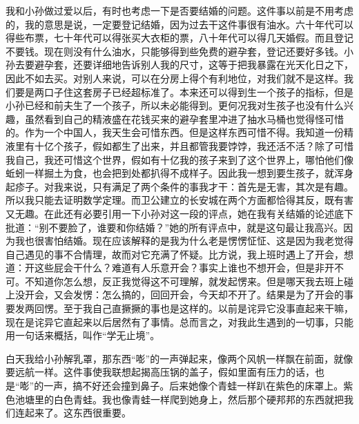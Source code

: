 我和小孙做过爱以后，有时也考虑一下是否要结婚的问题。这件事以前是不用考虑的，我的意思是说，一定要登记结婚，因为过去干这件事很有油水。六十年代可以得些布票，七十年代可以得张买大衣柜的票，八十年代可以得几天婚假。而且登记不要钱。现在则没有什么油水，只能够得到些免费的避孕套，登记还要好多钱。小孙去要避孕套，还要详细地告诉别人我的尺寸，这等于把我暴露在光天化日之下，因此不如去买。对别人来说，可以在分房上得个有利地位，对我们就不是这样。我们要是两口子住这套房子已经超标准了。本来还可以得到生一个孩子的指标，但是小孙已经和前夫生了一个孩子，所以未必能得到。更何况我对生孩子也没有什么兴趣，虽然看到自己的精液盛在花钱买来的避孕套里冲进了抽水马桶也觉得怪可惜的。作为一个中国人，我天生会可惜东西。但是这样东西可惜不得。我知道一份精液里有十亿个孩子，假如都生了出来，并且都管我要饽饽，我还活不活？除了可惜我自己，我还可惜这个世界，假如有十亿我的孩子来到了这个世界上，哪怕他们像蚯蚓一样掘土为食，也会把到处都扒得不成样子。因此我一想到要生孩子，就浑身起疹子。对我来说，只有满足了两个条件的事我才干：首先是无害，其次是有趣。所以我只能去证明数学定理。而卫公建立的长安城在两个方面都恰得其反，既有害又无趣。在此还有必要引用一下小孙对这一段的评点，她在我有关结婚的论述底下批道：“别不要脸了，谁要和你结婚？”她的所有评点中，就是这句最让我高兴。因为我也很害怕结婚。现在应该解释的是我为什么老是愣愣怔怔、这是因为我老觉得自己遇见的事不合情理，故而对它充满了怀疑。比方说，我上班时遇上了开会，想道：开这些屁会干什么？难道有人乐意开会？事实上谁也不想开会，但是非开不可。不知道你怎么想，反正我觉得这不可理解，就发起愣来。但是哪天我去班上碰上没开会，又会发愣：怎么搞的，回回开会，今天却不开了。结果是为了开会的事要发两回愣。至于我自己直撅撅的事也是这样的。以前是诧异它没事直起来干嘛，现在是诧异它直起来以后居然有了事情。总而言之，对我此生遇到的一切事，只能用一句话来概括，叫作“学无止境”。 

白天我给小孙解乳罩，那东西“嘭”的一声弹起来，像两个风帆一样飘在前面，就像要远航一样。这件事使我联想起揭高压锅的盖子，假如里面有压力的话，也是“嘭”的一声，搞不好还会撞到鼻子。后来她像个青蛙一样趴在紫色的床罩上。紫色池塘里的白色青蛙。我也像青蛙一样爬到她身上，然后那个硬邦邦的东西就把我们连起来了。这东西很重要。 

